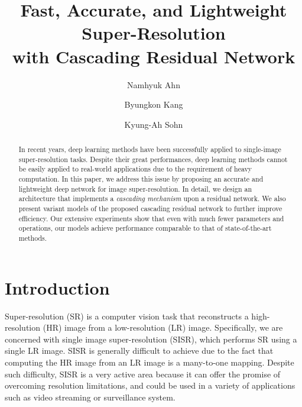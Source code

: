 \documentclass[runningheads]{llncs}
\begin{document}
\title{Fast, Accurate, and Lightweight Super-Resolution\\with Cascading Residual Network}


\author{Namhyuk Ahn\inst{} \and
        Byungkon Kang\inst{} \and
        Kyung-Ah Sohn\inst{}}

\maketitle


\begin{abstract}
In recent years, deep learning methods have been successfully applied to single-image super-resolution tasks. Despite their great performances, deep learning methods cannot be easily applied to real-world applications due to the requirement of heavy computation. In this paper, we address this issue by proposing an accurate and lightweight deep network for image super-resolution. In detail, we design an architecture that implements a \textit{cascading mechanism} upon a residual network. We also present variant models of the proposed cascading residual network to further improve efficiency. Our extensive experiments show that even with much fewer parameters and operations, our models achieve performance comparable to that of state-of-the-art methods.
\end{abstract}



\section{Introduction}
\label{sec:intro}
Super-resolution (SR) is a computer vision task that reconstructs a high-resolution (HR) image from a low-resolution (LR) image. Specifically, we are concerned with single image super-resolution (SISR), which performs SR using a single LR image. SISR is generally difficult to achieve due to the fact that computing the HR image from an LR image is a many-to-one mapping. Despite such difficulty, SISR is a very active area because it can offer the promise of overcoming resolution limitations, and could be used in a variety of applications such as video streaming or surveillance system.
\end{document}
